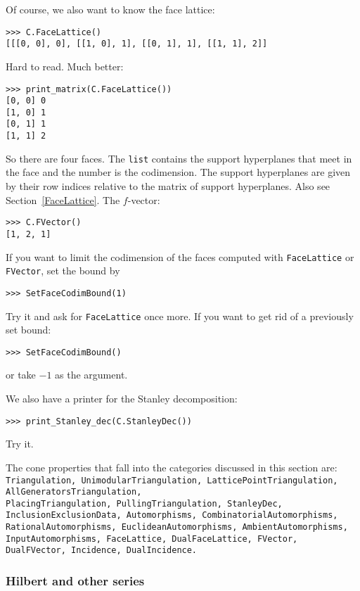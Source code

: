 \documentclass[12pt,a4paper]{scrartcl}
\theoremstyle{definition}
\def\ttt{\texttt}
\begin{document}
\begin{small}
Of course, we also want to know the face lattice:
\begin{Verbatim}
>>> C.FaceLattice()
[[[0, 0], 0], [[1, 0], 1], [[0, 1], 1], [[1, 1], 2]]
\end{Verbatim}
Hard to read. Much better:
\begin{Verbatim}
>>> print_matrix(C.FaceLattice())
[0, 0] 0
[1, 0] 1
[0, 1] 1
[1, 1] 2
\end{Verbatim}
So there are four faces. The \verb|list| contains the support hyperplanes that meet in the face and the number is the codimension. The support hyperplanes are given by their row indices relative to the matrix of support hyperplanes. Also see Section~\ref{FaceLattice}. The $f$-vector:
\begin{Verbatim}
>>> C.FVector()
[1, 2, 1]
\end{Verbatim}

If you want to limit the codimension of the faces computed with \verb|FaceLattice| or \verb|FVector|, set the bound by
\begin{Verbatim}
>>> SetFaceCodimBound(1)
\end{Verbatim}
Try it and ask for \verb|FaceLattice| once more. If you want to get rid of a previously set bound:
\begin{Verbatim}
>>> SetFaceCodimBound()
\end{Verbatim}
or take $-1$ as the argument.

We also have a printer for the Stanley decomposition:
\begin{Verbatim}
>>> print_Stanley_dec(C.StanleyDec())
\end{Verbatim}
Try it.

The cone properties that fall into the categories discussed in this section are: \ttt{    Triangulation,
	UnimodularTriangulation,
	LatticePointTriangulation,
	AllGeneratorsTriangulation,\\
	PlacingTriangulation,
	PullingTriangulation,
	StanleyDec,
	InclusionExclusionData,
	Automorphisms,
	CombinatorialAutomorphisms,
	RationalAutomorphisms,
	EuclideanAutomorphisms,
	AmbientAutomorphisms,
	InputAutomorphisms,
	FaceLattice,
	DualFaceLattice,
	FVector,
	DualFVector,
	Incidence,
	DualIncidence.}

\subsubsection{Hilbert and other series}


\end{small}
\end{document}
